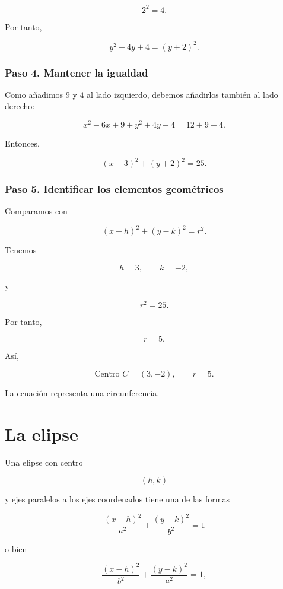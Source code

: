 \documentclass[12pt]{article}
\theoremstyle{plain}
\theoremstyle{definition}
\theoremstyle{remark}
\begin{document}
{\[
2^2=4.
\]

Por tanto,

\[
y^2+4y+4=(y+2)^2.
\]

\subsubsection*{Paso 4. Mantener la igualdad}

Como añadimos \(9\) y \(4\) al lado izquierdo, debemos añadirlos también
al lado derecho:

\[
x^2-6x+9+y^2+4y+4
=
12+9+4.
\]

Entonces,

\[
(x-3)^2+(y+2)^2=25.
\]

\subsubsection*{Paso 5. Identificar los elementos geométricos}

Comparamos con

\[
(x-h)^2+(y-k)^2=r^2.
\]

Tenemos

\[
h=3,
\qquad
k=-2,
\]

y

\[
r^2=25.
\]

Por tanto,

\[
r=5.
\]

Así,

\[
\boxed{
\text{Centro }C=(3,-2),
\qquad
r=5.
}
\]

La ecuación representa una circunferencia.

\section*{La elipse}

Una elipse con centro

\[
(h,k)
\]

y ejes paralelos a los ejes coordenados tiene una de las formas

\[
\boxed{
\frac{(x-h)^2}{a^2}
+
\frac{(y-k)^2}{b^2}
=1
}
\]

o bien

\[
\boxed{
\frac{(x-h)^2}{b^2}
+
\frac{(y-k)^2}{a^2}
=1,
}
\]

}
\end{document}
